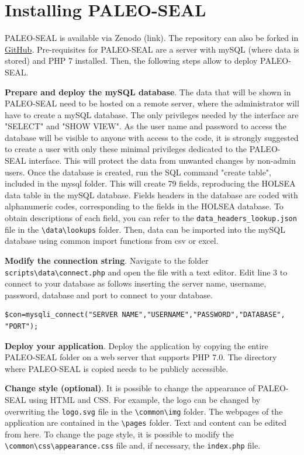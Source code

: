 \documentclass[a4paper,fleqn]{cas-dc}
\begin{document}
\section{Installing PALEO-SEAL}
PALEO-SEAL is available via Zenodo (link). The repository can also be forked in \href{https://github.com/jDrechsel/PALEO-SEAL.git}{GitHub}. Pre-requisites for PALEO-SEAL are a server with mySQL (where data is stored) and PHP 7 installed. Then, the following steps allow to deploy PALEO-SEAL.

\textbf{Prepare and deploy the mySQL database}. The data that will be shown in PALEO-SEAL need to be hosted on a remote server, where the administrator will have to create a mySQL database. The only privileges needed by the interface are "SELECT" and "SHOW VIEW". As the user name and password to access the database will be visible to anyone with access to the code, it is strongly suggested to create a user with only these minimal privileges dedicated to the PALEO-SEAL interface. This will protect the data from unwanted changes by non-admin users. Once the database is created, run the SQL command "create table", included in the mysql folder. This will create 79 fields, reproducing the HOLSEA data table in the mySQL database. Fields headers in the database are coded with alphanumeric codes, corresponding to the fields in the HOLSEA database. To obtain descriptions of each field, you can refer to the \texttt{data\_headers\_lookup.json} file in the \texttt{\textbackslash data\textbackslash lookups} folder. Then, data can be imported into the mySQL database using common import functions from csv or excel.

\textbf{Modify the connection string}. Navigate to the folder \texttt{scripts\textbackslash data\textbackslash connect.php} and open the file with a text editor. Edit line 3 to connect to your database as follows inserting the server name, username, password, database and port to connect to your database.

\begin{lstlisting}
$con=mysqli_connect("SERVER NAME","USERNAME","PASSWORD","DATABASE", "PORT");
\end{lstlisting}


\textbf{Deploy your application}. Deploy the application by copying the entire PALEO-SEAL folder on a web server that supports PHP 7.0. The directory where PALEO-SEAL is copied needs to be publicly accessible.

\textbf{Change style (optional)}. It is possible to change the appearance of PALEO-SEAL using HTML and CSS. For example, the logo can be changed by overwriting the \texttt{logo.svg} file in the \texttt{\textbackslash common\textbackslash img} folder. The webpages of the application are contained in the \texttt{\textbackslash pages} folder. Text and content can be edited from here. To change the page style, it is possible to modify the \texttt{\textbackslash common\textbackslash css\textbackslash appearance.css} file and, if necessary, the \texttt{index.php} file.
\end{document}

